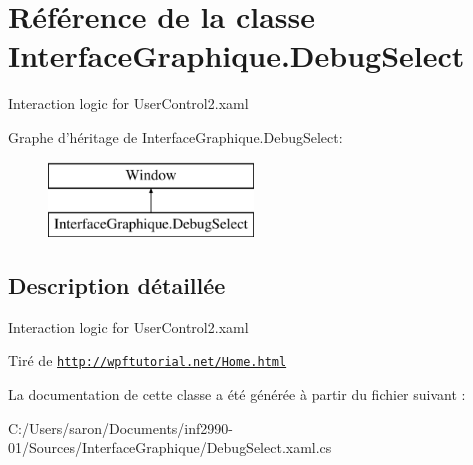 \hypertarget{class_interface_graphique_1_1_debug_select}{\section{Référence de la classe Interface\-Graphique.\-Debug\-Select}
\label{class_interface_graphique_1_1_debug_select}
}


Interaction logic for User\-Control2.\-xaml  


Graphe d'héritage de Interface\-Graphique.\-Debug\-Select\-:\begin{figure}[H]
\begin{center}
\leavevmode
\includegraphics[height=2.000000cm]{class_interface_graphique_1_1_debug_select}
\end{center}
\end{figure}


\subsection{Description détaillée}
Interaction logic for User\-Control2.\-xaml 

Tiré de \href{http://wpftutorial.net/Home.html}{\tt http\-://wpftutorial.\-net/\-Home.\-html} 

La documentation de cette classe a été générée à partir du fichier suivant \-:\begin{DoxyCompactItemize}
\item 
C\-:/\-Users/saron/\-Documents/inf2990-\/01/\-Sources/\-Interface\-Graphique/Debug\-Select.\-xaml.\-cs\end{DoxyCompactItemize}
